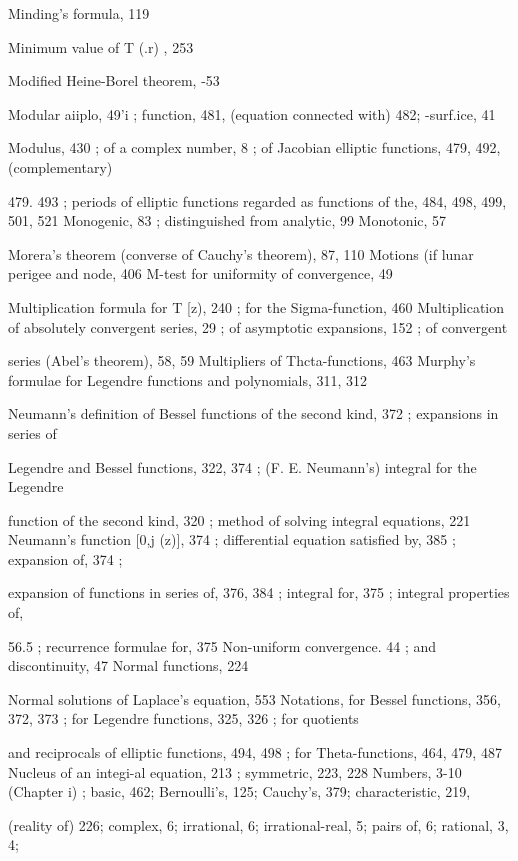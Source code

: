Minding's formula, 119

Minimum value of T (.r) , 253

%
%

Modified Heine-Borel theorem, -53

Modular aiiplo, 49'i ; function, 481, (equation connected with) 482; -surf.ice, 41

Modulus, 430 ; of a complex number, 8 ; of Jacobian elliptic functions, 479, 492, (complementary)

479. 493 ; periods of elliptic functions regarded as functions of the, 484, 498, 499, 501, 521
Monogenic, 83 ; distinguished from analytic, 99
Monotonic, 57

Morera's theorem (converse of Cauchy's theorem), 87, 110
Motions (if lunar perigee and node, 406
M-test for uniformity of convergence, 49

Multiplication formula for T [z), 240 ; for the Sigma-function, 460
Multiplication of absolutely convergent series, 29 ; of asymptotic expansions, 152 ; of convergent

series (Abel's theorem), 58, 59
Multipliers of Thcta-functions, 463
Murphy's formulae for Legendre functions and polynomials, 311, 312

Neumann's definition of Bessel functions of the second kind, 372 ; expansions in series of

Legendre and Bessel functions, 322, 374 ; (F. E. Neumann's) integral for the Legendre

function of the second kind, 320 ; method of solving integral equations, 221
Neumann's function [0,j (z)], 374 ; differential equation satisfied by, 385 ; expansion of, 374 ;

expansion of functions in series of, 376, 384 ; integral for, 375 ; integral properties of,

56.5 ; recurrence formulae for, 375
Non-uniform convergence. 44 ; and discontinuity, 47
Normal functions, 224

Normal solutions of Laplace's equation, 553
Notations, for Bessel functions, 356, 372, 373 ; for Legendre functions, 325, 326 ; for quotients

and reciprocals of elliptic functions, 494, 498 ; for Theta-functions, 464, 479, 487
Nucleus of an integi-al equation, 213 ; symmetric, 223, 228
Numbers, 3-10 (Chapter i) ; basic, 462; Bernoulli's, 125; Cauchy's, 379; characteristic, 219,

(reality of) 226; complex, 6; irrational, 6; irrational-real, 5; pairs of, 6; rational, 3, 4;

